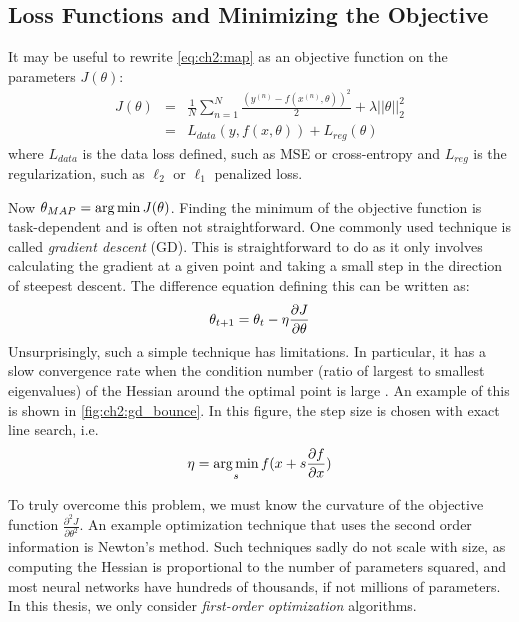 \subsection{Loss Functions and Minimizing the Objective}
  It may be useful to rewrite \eqref{eq:ch2:map} as an objective function on the
  parameters $J(\theta)$:
  \begin{eqnarray}
    J(\theta) &=&\frac{1}{N}\sum_{n=1}^{N} \frac{\left(y^{(n)} - f(x^{(n)}, \theta)\right)^2}{2} + \lambda ||\theta||_2^2 \\
              &=& L_{data}(y, f(x, \theta)) + L_{reg}(\theta)
  \end{eqnarray}
  where $L_{data}$ is the data loss defined, such as MSE or cross-entropy and
  $L_{reg}$ is the regularization, such as $\ell_2$ or $\ell_1$ penalized loss. 
  
  Now $\theta_{MAP} = \operatorname*{arg\,min} J(\theta)$. Finding the minimum of the objective
  function is task-dependent and is often not straightforward. One commonly used
  technique is called \emph{gradient descent} (GD). This is straightforward to do as
  it only involves calculating the gradient at a given point and taking a small
  step in the direction of steepest descent. The difference equation defining 
  this can be written as:
  \begin{equation}\label{eq:ch2:gd}
    \theta_{t+1} = \theta_t - \eta \frac{\partial J}{\partial \theta}
  \end{equation}
  Unsurprisingly, such a simple technique has limitations. In particular, it
  has a slow convergence rate when the condition number (ratio of largest to 
  smallest eigenvalues) of the Hessian around the optimal point is large
  \cite{boyd_convex_2004}. An example of this is shown in
  \autoref{fig:ch2:gd_bounce}. In this figure, the step size is chosen with
  exact line search, i.e.
  \begin{equation}\label{eq:ch2:search}
    \eta = \operatorname*{arg\,min}_s f(x + s \frac{\partial f}{\partial x})
  \end{equation}  
  
  To truly overcome this problem, we must know the curvature
  of the objective function $\frac{\partial^2 J}{\partial \theta^2}$. An example
  optimization technique that uses the second order information is Newton's
  method. Such techniques sadly do not scale with size, as computing the Hessian
  is proportional to the number of parameters squared, and most neural networks
  have hundreds of thousands, if not millions of parameters. In this thesis, we
  only consider \emph{first-order optimization} algorithms.

